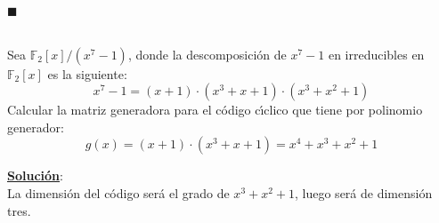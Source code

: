 \begin{flushright}
$\blacksquare$
\end{flushright}
%
\newpage
%
%
%
\begin{ejercicio}
\ \\
Sea $\mathbb{F}_2[x]/(x^7-1)$, donde la descomposici\'on de $x^7-1$ en 
irreducibles en $\mathbb{F}_2[x]$ es la siguiente:
\begin{displaymath}
x^7-1=(x+1)\cdot(x^3+x+1)\cdot(x^3+x^2+1)
\end{displaymath}
Calcular la matriz generadora para el c\'odigo c\'{\i}clico que tiene por
polinomio generador:
\begin{displaymath}
g(x)=(x+1)\cdot(x^3+x+1)=x^4+x^3+x^2+1
\end{displaymath}
\end{ejercicio}
\underline{\textbf{Soluci\'on}}:\\
La dimensi\'on del c\'odigo ser\'a el grado de $x^3+x^2+1$, luego ser\'a
de dimensi\'on tres.\\

